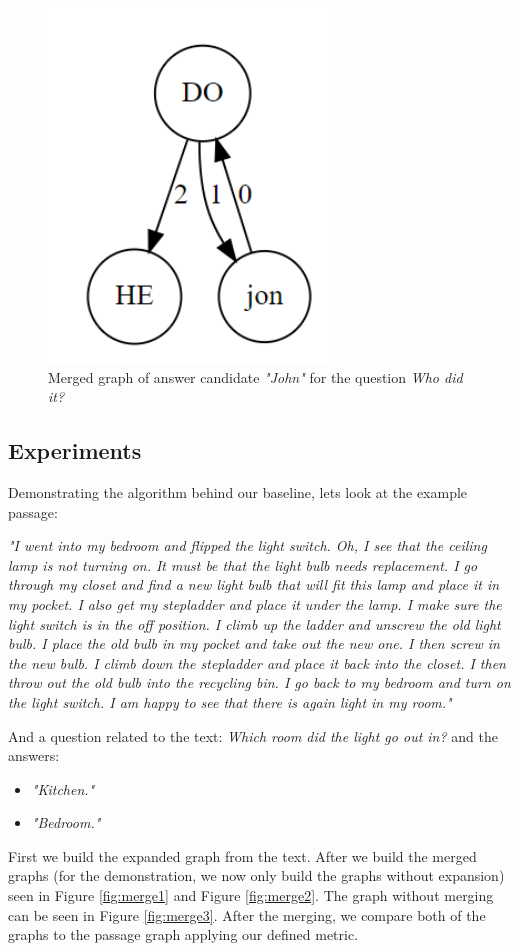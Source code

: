 \begin{figure}
	\centering
	\includegraphics[scale=0.3]{figures/merge}
	\caption{Merged graph of answer candidate \textit{"John"} for the
		question \textit{Who did it?}}
	\label{fig:merge}
\end{figure}

\subsection{Experiments}
\label{sec:exp}

Demonstrating the algorithm behind our baseline, lets look at the example passage:
\begin{center}
	\textit{ "I went into my bedroom and flipped the light switch. Oh, I see that the ceiling lamp is not turning on. It must be that the light bulb needs replacement. I go through my closet and find a new light bulb that will fit this lamp and place it in my pocket. I also get my stepladder and place it under the lamp. I make sure the light switch is in the off position. I climb up the ladder and unscrew the old light bulb. I place the old bulb in my pocket and take out the new one. I then screw in the new bulb. I climb down the stepladder and place it back into the closet. I then throw out the old bulb into the recycling bin. I go back to my bedroom and turn on the light switch. I am happy to see that there is again light in my room."}
\end{center}
And a question related to the text: \textit{Which room did the light go out in?} and the answers:
\begin{itemize}
	\item \textit{"Kitchen."}
	\item \textit{"Bedroom."}
\end{itemize}
First we build the expanded graph from the text. After we build the merged graphs (for the demonstration, we now only build the graphs without expansion) seen in Figure \ref{fig:merge1} and Figure \ref{fig:merge2}. The graph without merging can be seen in Figure \ref{fig:merge3}. After the merging, we compare both of the graphs to the passage graph applying our defined metric.

